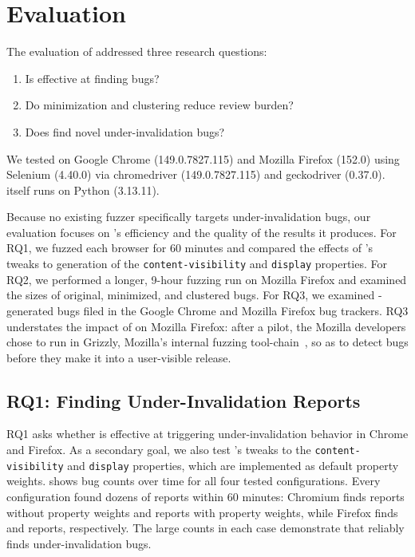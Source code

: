 \section{Evaluation}
\label{sec:evaluation}

The evaluation of \toolname addressed three research questions:

\begin{enumerate}
\item[RQ1] Is \toolname effective at finding \UnderInvalidation bugs?
\item[RQ2] Do minimization and clustering reduce review burden?
\item[RQ3] Does \toolname find novel under-invalidation bugs?
\end{enumerate}

We tested \toolname on Google Chrome (149.0.7827.115)
  and Mozilla Firefox (152.0)
  using Selenium (4.40.0) via
  chromedriver (149.0.7827.115)
 and geckodriver (0.37.0).
\toolname itself runs on Python (3.13.11).

Because no existing fuzzer specifically targets under-invalidation bugs,
 our evaluation focuses on \toolname’s efficiency
 and the quality of the results it produces. 
For RQ1, we fuzzed each browser for 60 minutes
  and compared the effects of
  \toolname's tweaks to generation of
  the \texttt{content-visibility} and \texttt{display} properties.
For RQ2, we performed a longer, 9-hour fuzzing run on Mozilla Firefox
  and examined the sizes of original, minimized, and clustered bugs.
For RQ3, we examined \toolname-generated bugs
  filed in the Google Chrome and Mozilla Firefox bug trackers.
RQ3 understates the impact of \toolname on Mozilla Firefox:
  after a pilot, the Mozilla developers chose to run \toolname
  in Grizzly, Mozilla's internal fuzzing tool-chain~\cite{grizzly},
  so as to detect bugs before they make it into
  a user-visible release.

\subsection{RQ1: Finding Under-Invalidation Reports}

RQ1 asks whether \toolname
  is effective at triggering under-invalidation behavior
  in Chrome and Firefox.
As a secondary goal, we also test \toolname's tweaks to
  the \texttt{content-visibility} and \texttt{display} properties,
  which are implemented as default property weights.
 shows bug counts over time
  for all four tested configurations.
Every configuration found
  dozens of reports within 60 minutes:
  Chromium finds \ChromiumNoWeightsBugs{} reports without property weights
  and \ChromiumWeightsBugs{} reports with property weights,
  while Firefox finds \FirefoxNoWeightsBugs{}
  and \FirefoxWeightsBugs{} reports, respectively.
The large counts in each case demonstrate that
  \toolname reliably finds under-invalidation bugs.

